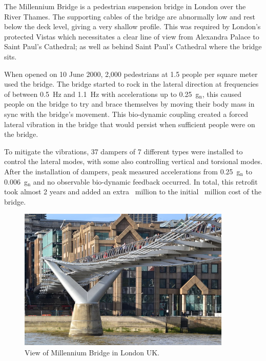 \documentclass[12pt,letter]{article}
\begin{document}
\begin{vibration_case_study}
	The Millennium Bridge is a pedestrian suspension bridge in London over the River Thames. The supporting cables of the bridge are abnormally low and rest below the deck level, giving a very shallow profile. This was required by London's protected Vistas which necessitates a clear line of view from Alexandra Palace to Saint Paul's Cathedral; as well as behind Saint Paul's Cathedral where the bridge sits. 

	When opened on 10 June 2000, 2,000 pedestrians at  1.5 people per square meter used the bridge. The bridge started to rock in the lateral direction at frequencies of between 0.5~Hz and 1.1~Hz with accelerations up to 0.25~g$_\text{n}$, this caused people on the bridge to try and brace themselves by moving their body mass in sync with the bridge's movement. This bio-dynamic coupling created a forced lateral vibration in the bridge that would persist when sufficient people were on the bridge.   

	To mitigate the vibrations, 37 dampers of 7 different types were installed to control the lateral modes, with some also controlling vertical and torsional modes. After the installation of dampers, peak measured accelerations from 0.25~g$_\text{n}$ to 0.006~g$_\text{n}$ and no observable bio-dynamic feedback occurred. In total, this retrofit took almost 2 years and added an extra ~million to the initial ~million cost of the bridge.
	
	\begin{figure}[H]
		\centering
		\includegraphics[width=4in]{../figures/Under_the_Millennium_Bridge}
		\caption{View of Millennium Bridge in London UK\protect\footnotemark[1].}
	\end{figure}
\end{vibration_case_study}
\end{document}
